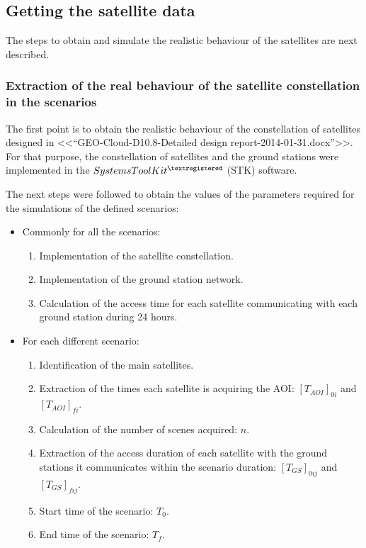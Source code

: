 \subsection{Getting the satellite data}
\label{subsec:getting-satellite-data}

The steps to obtain and simulate the realistic behaviour of the satellites are
next described.


\subsubsection{Extraction of the real behaviour of the satellite constellation
  in the scenarios}
\label{subsubsec:extraction}

The first point is to obtain the realistic behaviour of the constellation of satellites designed in <<“GEO-Cloud-D10.8-Detailed design report-2014-01-31.docx”>>.  For that purpose, the constellation of satellites and the ground stations were implemented in the \emph{$Systems Tool Kit^{\textregistered}$} (STK) software.

The next steps were followed to obtain the values of the parameters required for the simulations of the defined scenarios:
\begin{itemize}
\item Commonly for all the scenarios:
\begin{enumerate}
\item Implementation of the satellite constellation.
\item Implementation of the ground station network.
\item Calculation of the access time for each satellite communicating with each
  ground station during 24 hours.
\setcounter{enumTemp}{\theenumi}
\end{enumerate}
\item For each different scenario:
\begin{enumerate}
\setcounter{enumi}{\theenumTemp}
\item Identification of the main satellites.
\item Extraction of the times each satellite is acquiring the AOI: $[T_{AOI}]_{0i}$ and $[T_{AOI}]_{fi}$.
\item Calculation of the number of scenes acquired: $n$.
\item Extraction of the access duration of each satellite with the ground stations it communicates within the scenario duration: $[T_{GS}]_{0ij}$ and $[T_{GS}]_{fij}$.
\item Start time of the scenario: $T_0$.
\item End time of the scenario: $T_f$.
\end{enumerate}
\end{itemize}

